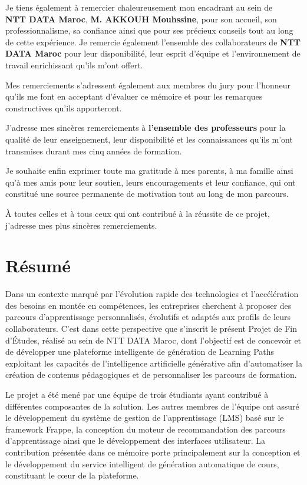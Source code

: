 \documentclass[12pt,a4paper,oneside]{report}
\begin{document}
Je tiens également à remercier chaleureusement mon encadrant au sein de \\ \textbf{NTT DATA Maroc}, \textbf{M. AKKOUH Mouhssine}, pour son accueil, son professionnalisme, sa confiance ainsi que pour ses précieux conseils tout au long de cette expérience. Je remercie également l'ensemble des collaborateurs de \textbf{NTT DATA Maroc} pour leur disponibilité, leur esprit d'équipe et l'environnement de travail enrichissant qu'ils m'ont offert.

Mes remerciements s'adressent également aux membres du jury pour l'honneur qu'ils me font en acceptant d'évaluer ce mémoire et pour les remarques constructives qu'ils apporteront.

J'adresse mes sincères remerciements à \textbf{l'ensemble des professeurs} pour la qualité de leur enseignement, leur disponibilité et les connaissances qu'ils m'ont transmises durant mes cinq années de formation.

Je souhaite enfin exprimer toute ma gratitude à mes parents, à ma famille ainsi qu'à mes amis pour leur soutien, leurs encouragements et leur confiance, qui ont constitué une source permanente de motivation tout au long de mon parcours.

À toutes celles et à tous ceux qui ont contribué à la réussite de ce projet, j'adresse mes plus sincères remerciements.





\chapter*{Résumé}

Dans un contexte marqué par l'évolution rapide des technologies et l'accélération des besoins en montée en compétences, les entreprises cherchent à proposer des parcours d'apprentissage personnalisés, évolutifs et adaptés aux profils de leurs collaborateurs. C'est dans cette perspective que s'inscrit le présent Projet de Fin d'Études, réalisé au sein de NTT DATA Maroc, dont l'objectif est de concevoir et de développer une plateforme intelligente de génération de Learning Paths exploitant les capacités de l'intelligence artificielle générative afin d'automatiser la création de contenus pédagogiques et de personnaliser les parcours de formation.

Le projet a été mené par une équipe de trois étudiants ayant contribué à différentes composantes de la solution. Les autres membres de l'équipe ont assuré le développement du système de gestion de l'apprentissage (LMS) basé sur le framework Frappe, la conception du moteur de recommandation des parcours d'apprentissage ainsi que le développement des interfaces utilisateur. La contribution présentée dans ce mémoire porte principalement sur la conception et le développement du service intelligent de génération automatique de cours, constituant le cœur de la plateforme.
\end{document}
